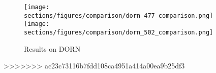 \begin{figure*}
  \texttt{[image: sections/figures/comparison/dorn\_477\_comparison.png]}
  \texttt{[image: sections/figures/comparison/dorn\_502\_comparison.png]}
  \caption{Results on DORN}
\end{figure*}
>>>>>>> ac23c73116b7fdd108ca4951a414a00ea9b25df3
% 
% 
 


  



